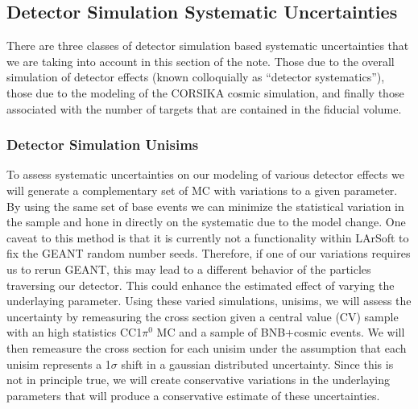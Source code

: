 \clearpage
\subsection{Detector Simulation Systematic Uncertainties}

There are three classes of detector simulation based systematic uncertainties that we are taking into account in this section of the note. Those due to the overall simulation of detector effects (known colloquially as ``detector systematics''), those due to the modeling of the CORSIKA cosmic simulation, and finally those associated with the number of targets that are contained in the fiducial volume.    

\subsubsection{Detector Simulation Unisims}
To assess systematic uncertainties on our modeling of various detector effects we will generate a complementary set of MC with variations to a given parameter. By using the same set of base events we can minimize the statistical variation in the sample and hone in directly on the systematic due to the model change. One caveat to this method is that it is currently not a functionality within LArSoft to fix the GEANT random number seeds. Therefore, if one of our variations requires us to rerun GEANT, this may lead to a different behavior of the particles traversing our detector. This could enhance the estimated effect of varying the underlaying parameter. Using these varied simulations, unisims, we will assess the uncertainty by remeasuring the cross section given a central value (CV) sample with an high statistics CC1$\pi^{0}$ MC and a sample of BNB+cosmic events. We will then remeasure the cross section for each unisim under the assumption that each unisim represents a 1$\sigma$ shift in a gaussian distributed uncertainty. Since this is not in principle true, we will create conservative variations in the underlaying parameters that will produce a conservative estimate of these uncertainties. 

